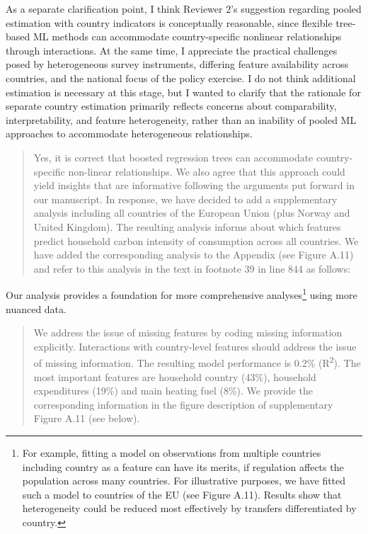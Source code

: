 \documentclass[11pt]{article}
\newenvironment{response}
{\begin{quote}\color{black}}
{\end{quote}}
\begin{document}
\begin{commentbox}
    As a separate clarification point, I think Reviewer 2’s suggestion regarding pooled estimation with country indicators is conceptually reasonable, since flexible tree-based ML methods can accommodate country-specific nonlinear relationships through interactions. At the same time, I appreciate the practical challenges posed by heterogeneous survey instruments, differing feature availability across countries, and the national focus of the policy exercise. I do not think additional estimation is necessary at this stage, but I wanted to clarify that the rationale for separate country estimation primarily reflects concerns about comparability, interpretability, and feature heterogeneity, rather than an inability of pooled ML approaches to accommodate heterogeneous relationships.
\end{commentbox}

\begin{response}
    Yes, it is correct that boosted regression trees can accommodate country-specific non-linear relationships. We also agree that this approach could yield insights that are informative following the arguments put forward in our manuscript. In response, we have decided to add a supplementary analysis including all countries of the European Union (plus Norway and United Kingdom). The resulting analysis informs about which features predict household carbon intensity of consumption across all countries. We have added the corresponding analysis to the Appendix (see Figure A.11) and refer to this analysis in the text in footnote 39 in line 844 as follows:
\end{response}

\begin{revisionbox}
    Our analysis provides a foundation for more comprehensive analyses\footnote{For example, fitting a model on observations from multiple countries including country as a feature can have its merits, if regulation affects the population across many countries. For illustrative purposes, we have fitted such a model to countries of the EU (see Figure A.11). Results show that heterogeneity could be reduced most effectively by transfers differentiated by country.} using more nuanced data.
\end{revisionbox}

\begin{response}
    We address the issue of missing features by coding missing information explicitly. Interactions with country-level features should address the issue of missing information. The resulting model performance is 0.2\% (R\textsuperscript{2}). The most important features are household country (43\%), household expenditures (19\%) and main heating fuel (8\%). We provide the corresponding information in the figure description of supplementary Figure A.11 (see below).  
\end{response}
\end{document}
